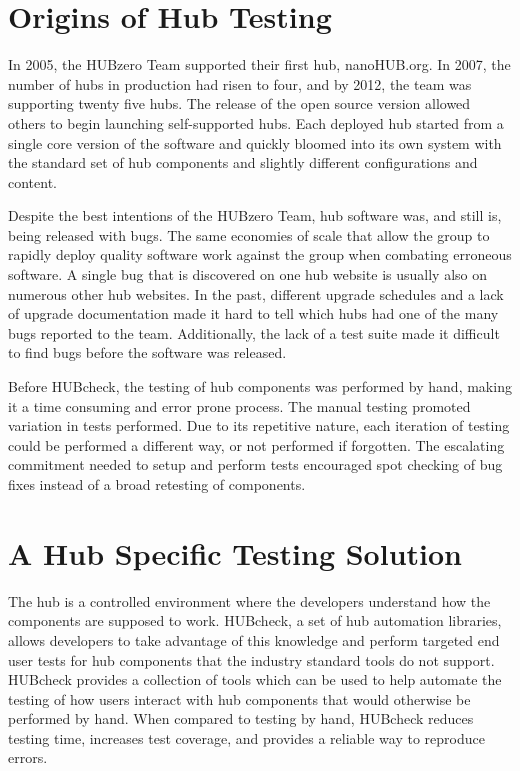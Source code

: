 \section{Origins of Hub Testing}
\label{sec:problems_with_the_hub}

In 2005, the HUBzero Team supported their first hub, nanoHUB.org. In
2007, the number of hubs in production had risen to four, and by 2012, the team
was supporting twenty five hubs. The release of the open source version allowed
others to begin launching self-supported hubs.  Each deployed hub started from
a single core version of the software and quickly bloomed into its own system
with the standard set of hub components and slightly different configurations
and content.

Despite the best intentions of the HUBzero Team, hub software was, and
still is, being released with bugs. The same economies of scale that allow the
group to rapidly deploy quality software work against the group when combating
erroneous software. A single bug that is discovered on one hub website is
usually also on numerous other hub websites.  In the past, different upgrade
schedules and a lack of upgrade documentation made it hard to tell which hubs
had one of the many bugs reported to the team. Additionally, the lack of a test
suite made it difficult to find bugs before the software was released.


Before HUBcheck, the testing of hub components was performed by hand, making it
a time consuming and error prone process.  The manual testing promoted
variation in tests performed. Due to its repetitive nature, each iteration of
testing could be performed a different way, or not performed if forgotten.  The
escalating commitment needed to setup and perform tests encouraged spot
checking of bug fixes instead of a broad retesting of components.


\section{A Hub Specific Testing Solution}
\label{sec:the_hubcheck_solution}

The hub is a controlled environment where the developers understand how the
components are supposed to work. HUBcheck, a set of hub automation libraries,
allows developers to take advantage of this knowledge and perform targeted end
user tests for hub components that the industry standard tools do not support.
HUBcheck provides a collection of tools which can be used to help automate the
testing of how users interact with hub components that would otherwise be
performed by hand.  When compared to testing by hand, HUBcheck reduces testing
time, increases test coverage, and provides a reliable way to reproduce errors.

